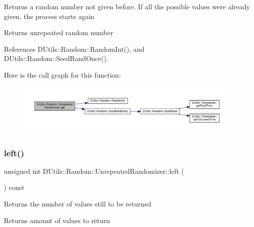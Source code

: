 Returns a random number not given before. If all the possible values were already given, the process starts again \begin{DoxyReturn}{Returns}
unrepeated random number 
\end{DoxyReturn}


References D\+Utils\+::\+Random\+::\+Random\+Int(), and D\+Utils\+::\+Random\+::\+Seed\+Rand\+Once().

Here is the call graph for this function\+:\nopagebreak
\begin{figure}[H]
\begin{center}
\leavevmode
\includegraphics[width=350pt]{classDUtils_1_1Random_1_1UnrepeatedRandomizer_ae1bf6a140e322962f65b2c98dc07a3ac_cgraph}
\end{center}
\end{figure}
\mbox{\label{classDUtils_1_1Random_1_1UnrepeatedRandomizer_a8ba0925ac2e14881505a9575466ddc4f}} 
\subsubsection{\texorpdfstring{left()}{left()}}
{\footnotesize\ttfamily unsigned int D\+Utils\+::\+Random\+::\+Unrepeated\+Randomizer\+::left (\begin{DoxyParamCaption}{ }\end{DoxyParamCaption}) const\hspace{0.3cm}{\ttfamily [inline]}}

Returns the number of values still to be returned \begin{DoxyReturn}{Returns}
amount of values to return 
\end{DoxyReturn}
\mbox{\label{classDUtils_1_1Random_1_1UnrepeatedRandomizer_a18f74b44fe6747fa3498bdbe6422648e}} 
